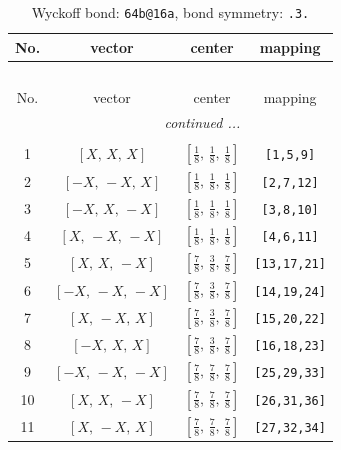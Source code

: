\documentclass[fleqn,8pt]{jsarticle}
\begin{document}
\begin{longtable}{cccc}
\caption{Wyckoff bond: {\tt 64b@16a}, bond symmetry: {\tt .3.}}
 \\
 \hline \hline
No. & vector & center & mapping \\ \hline \endfirsthead

\multicolumn{3}{l}{\tablename\ \thetable{}} \\
 \hline \hline
No. & vector & center & mapping \\ \hline \endhead

 \hline \hline
\multicolumn{3}{r}{\footnotesize\it continued ...} \\ \endfoot

 \hline \hline
\multicolumn{3}{r}{} \\ \endlastfoot

1 & $\left[ X,\, X,\, X \right]$ & $\left[ \frac{1}{8},\, \frac{1}{8},\, \frac{1}{8} \right]$ & {\tt [1,5,9]} \\ \hline
2 & $\left[ - X,\, - X,\, X \right]$ & $\left[ \frac{1}{8},\, \frac{1}{8},\, \frac{1}{8} \right]$ & {\tt [2,7,12]} \\ \hline
3 & $\left[ - X,\, X,\, - X \right]$ & $\left[ \frac{1}{8},\, \frac{1}{8},\, \frac{1}{8} \right]$ & {\tt [3,8,10]} \\ \hline
4 & $\left[ X,\, - X,\, - X \right]$ & $\left[ \frac{1}{8},\, \frac{1}{8},\, \frac{1}{8} \right]$ & {\tt [4,6,11]} \\ \hline
5 & $\left[ X,\, X,\, - X \right]$ & $\left[ \frac{7}{8},\, \frac{3}{8},\, \frac{7}{8} \right]$ & {\tt [13,17,21]} \\ \hline
6 & $\left[ - X,\, - X,\, - X \right]$ & $\left[ \frac{7}{8},\, \frac{3}{8},\, \frac{7}{8} \right]$ & {\tt [14,19,24]} \\ \hline
7 & $\left[ X,\, - X,\, X \right]$ & $\left[ \frac{7}{8},\, \frac{3}{8},\, \frac{7}{8} \right]$ & {\tt [15,20,22]} \\ \hline
8 & $\left[ - X,\, X,\, X \right]$ & $\left[ \frac{7}{8},\, \frac{3}{8},\, \frac{7}{8} \right]$ & {\tt [16,18,23]} \\ \hline
9 & $\left[ - X,\, - X,\, - X \right]$ & $\left[ \frac{7}{8},\, \frac{7}{8},\, \frac{7}{8} \right]$ & {\tt [25,29,33]} \\ \hline
10 & $\left[ X,\, X,\, - X \right]$ & $\left[ \frac{7}{8},\, \frac{7}{8},\, \frac{7}{8} \right]$ & {\tt [26,31,36]} \\ \hline
11 & $\left[ X,\, - X,\, X \right]$ & $\left[ \frac{7}{8},\, \frac{7}{8},\, \frac{7}{8} \right]$ & {\tt [27,32,34]} \\ \hline

\end{longtable}
\end{document}

